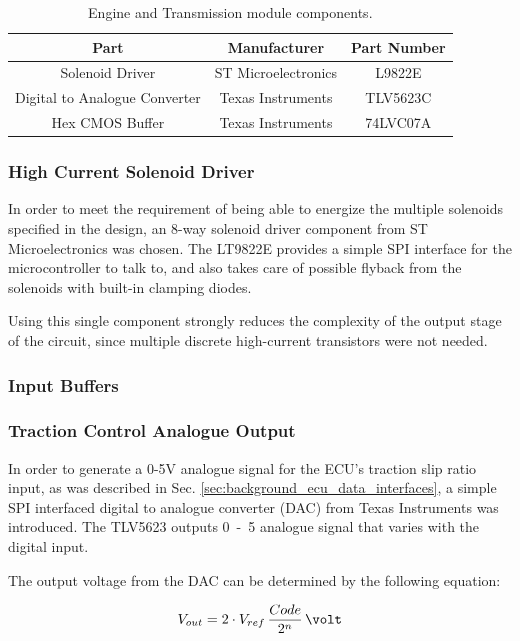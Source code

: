 \begin{table}
  \caption{Engine and Transmission module components.\label{table:engine_transmission_module_components}}
  \centering
  \begin{tabular}{|c|c|c|}
    \hline 
    Part & Manufacturer & Part Number\tabularnewline 
    \hline \hline
    Solenoid Driver & ST Microelectronics & L9822E \tabularnewline
    \hline
    Digital to Analogue Converter & Texas Instruments & TLV5623C \tabularnewline
    \hline
    Hex CMOS Buffer & Texas Instruments & 74LVC07A \tabularnewline
    \hline
  \end{tabular}
\end{table}


\subsubsection{High Current Solenoid Driver}

In order to meet the requirement of being able to energize the multiple solenoids specified in the design, an 8-way solenoid driver component from ST Microelectronics was chosen. The LT9822E provides a simple SPI interface for the microcontroller to talk to, and also takes care of possible flyback from the solenoids with built-in clamping diodes.

Using this single component strongly reduces the complexity of the output stage of the circuit, since multiple discrete high-current transistors were not needed.

\subsubsection{Input Buffers}


\subsubsection{Traction Control Analogue Output}

In order to generate a 0-5V analogue signal for the ECU's traction slip ratio input, as was described in Sec. \ref{sec:background_ecu_data_interfaces}, a simple SPI interfaced digital to analogue converter (DAC) from Texas Instruments was introduced. The TLV5623 outputs \unit{0-5}{\volt} analogue signal that varies with the digital input.

The output voltage from the DAC can be determined by the following equation:

\begin{equation}
V_{out}=2\cdot{V_{ref}}\,\frac{Code}{2^{n}}\,\volt
\end{equation}

